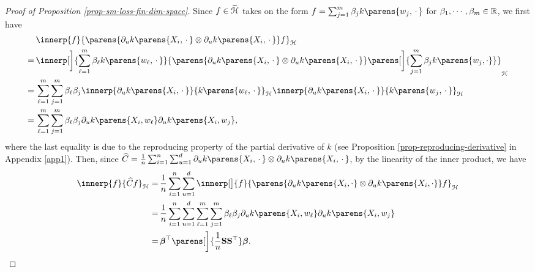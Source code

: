 \begin{proof}[Proof of Proposition \ref{prop-sm-loss-fin-dim-space}]
	Since $f \in \widetilde{\mathcal{H}}$ takes on the form $f = \sum_{j=1}^m \beta_j k \parens{w_j, \,\cdot\,}$ for $\beta_1, \cdots, \beta_m \in \mathbb{R}$, we first have 
	\begin{align*}
		& \, \innerp{f}{\parens{\partial_u k \parens{X_i, \,\cdot\,} \otimes \partial_u k \parens{X_i, \,\cdot\,}} f}_{\calH} \nonumber \\ 
		= & \, \innerp[\bigg]{\sum_{\ell=1}^m \beta_{\ell} k \parens{w_\ell, \,\cdot\,}}{\parens{\partial_u k \parens{X_i, \,\cdot\,} \otimes \partial_u k \parens{X_i, \,\cdot\,}} \parens[\bigg]{\sum_{j=1}^m \beta_j k \parens{w_j, \cdot}}}_{\calH} \nonumber \\ 
		= & \, \sum_{\ell=1}^m \sum_{j=1}^m \beta_{\ell} \beta_j \innerp{\partial_u k \parens{X_i, \,\cdot\,}}{k \parens{w_\ell, \,\cdot\,}}_{\calH} \innerp{\partial_u k \parens{X_i, \,\cdot\,}}{k \parens{w_j, \,\cdot\,}}_{\calH} \nonumber \\ 
		= & \, \sum_{\ell=1}^m \sum_{j=1}^m \beta_{\ell} \beta_j \partial_u k \parens{X_i, w_\ell} \partial_u k \parens{X_i, w_j}, 
	\end{align*}
	where the last equality is due to the reproducing property of the partial derivative of $k$ (see Proposition \ref{prop-reproducing-derivative} in Appendix \ref{app1}). Then, since $\widehat{C} = \frac{1}{n} \sum_{i=1}^n \sum_{u=1}^d \partial_u k \parens{X_i, \,\cdot\,} \otimes \partial_u k \parens{X_i, \,\cdot\,}$, by the linearity of the inner product, we have 
	\begin{align*}
		\innerp{f}{\widehat{C} f}_{\calH} = & \, \frac{1}{n} \sum_{i=1}^n \sum_{u=1}^d \innerp[\big]{f}{\parens{\partial_u k \parens{X_i, \cdot} \otimes \partial_u k \parens{X_i, \cdot}} f}_{\calH} \nonumber \\ 
		= & \, \frac{1}{n} \sum_{i=1}^n \sum_{u=1}^d \sum_{\ell=1}^m \sum_{j=1}^m \beta_{\ell} \beta_j \partial_u k \parens{X_i, w_\ell} \partial_u k \parens{X_i, w_j} \\ 
		= & \, \bbeta^\top \parens[\bigg]{\frac{1}{n} \bS \bS^\top } \bbeta. 

\end{align*}
\end{proof}
